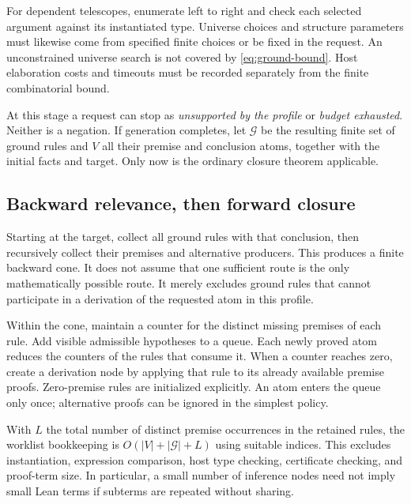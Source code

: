 \documentclass[11pt,letterpaper]{article}
\theoremstyle{definition}\newtheorem{definition}[theorem]{Definition}
\theoremstyle{remark}\newtheorem{remark}[theorem]{Remark}
\begin{document}
For dependent telescopes, enumerate left to right and check each selected
argument against its instantiated type. Universe choices and structure
parameters must likewise come from specified finite choices or be fixed in
the request. An unconstrained universe search is not covered by
\eqref{eq:ground-bound}. Host elaboration costs and timeouts must be recorded
separately from the finite combinatorial bound.

At this stage a request can stop as \emph{unsupported by the profile} or
\emph{budget exhausted}. Neither is a negation. If generation completes, let
$\mathcal G$ be the resulting finite set of ground rules and $V$ all their
premise and conclusion atoms, together with the initial facts and target.
Only now is the ordinary closure theorem applicable.

\subsection{Backward relevance, then forward closure}
Starting at the target, collect all ground rules with that conclusion, then
recursively collect their premises and alternative producers. This produces
a finite backward cone. It does not assume that one sufficient route is the
only mathematically possible route. It merely excludes ground rules that
cannot participate in a derivation of the requested atom in this profile.

Within the cone, maintain a counter for the distinct missing premises of each
rule. Add visible admissible hypotheses to a queue. Each newly proved atom
reduces the counters of the rules that consume it. When a counter reaches
zero, create a derivation node by applying that rule to its already available
premise proofs. Zero-premise rules are initialized explicitly. An atom enters
the queue only once; alternative proofs can be ignored in the simplest policy.

With $L$ the total number of distinct premise occurrences in the retained
rules, the worklist bookkeeping is $O(|V|+|\mathcal G|+L)$ using suitable
indices. This excludes instantiation, expression comparison, host type
checking, certificate checking, and proof-term size. In particular, a small
number of inference nodes need not imply small Lean terms if subterms are
repeated without sharing.
\end{document}
